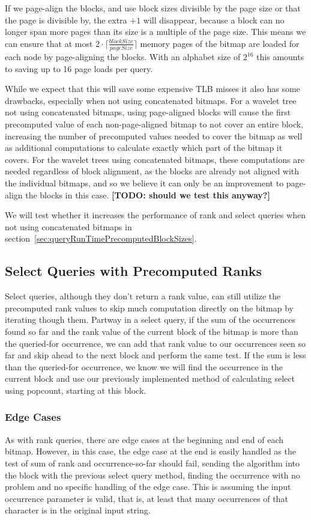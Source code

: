 If we page-align the blocks, and use block sizes divisible by the page size or that the page is divisible by, the extra $+1$ will disappear, because a block can no longer span more pages than its size is a multiple of the page size.
This means we can ensure that at most $2 \cdot \lceil\frac{blockSize}{pageSize}\rceil$ memory pages of the bitmap are loaded for each node by page-aligning the blocks.
With an alphabet size of $2^{16}$ this amounts to saving up to 16 page loads per query.

While we expect that this will save some expensive TLB misses it also has some drawbacks, especially when not using concatenated bitmaps.
For a wavelet tree not using concatenated bitmaps, using page-aligned blocks will cause the first precomputed value of each non-page-aligned bitmap to not cover an entire block, increasing the number of precomputed values needed to cover the bitmap as well as additional computations to calculate exactly which part of the bitmap it covers.
For the wavelet trees using concatenated bitmaps, these computations are needed regardless of block alignment, as the blocks are already not aligned with the individual bitmaps, and so we believe it can only be an improvement to page-align the blocks in this case. \textbf{[TODO: should we test this anyway?]}

We will test whether it increases the performance of rank and select queries when not using concatenated bitmaps in section~\ref{sec:queryRunTimePrecomputedBlockSizes}.


\subsection{Select Queries with Precomputed Ranks}
Select queries, although they don't return a rank value, can still utilize the precomputed rank values to skip much computation directly on the bitmap by iterating though them.
Partway in a select query, if the sum of the occurrences found so far and the rank value of the current block of the bitmap is more than the queried-for occurrence, we can add that rank value to our occurrences seen so far and skip ahead to the next block and perform the same test.
If the sum is less than the queried-for occurrence, we know we will find the occurrence in the current block and use our previously implemented method of calculating select using popcount, starting at this block.


\subsubsection{Edge Cases}
As with rank queries, there are edge cases at the beginning and end of each bitmap.
However, in this case, the edge case at the end is easily handled as the test of sum of rank and occurrence-so-far should fail, sending the algorithm into the block with the previous select query method, finding the occurrence with no problem and no specific handling of the edge case.
This is assuming the input occurrence parameter is valid, that is, at least that many occurrences of that character is in the original input string.

